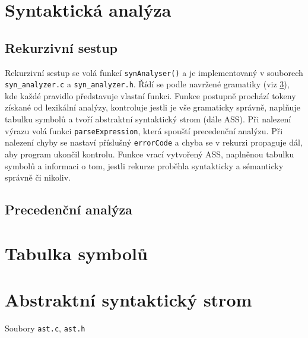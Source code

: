 \documentclass[a4paper, 12pt]{article}
\begin{document}
    \section{Syntaktická analýza}
    
    \subsection{Rekurzivní sestup} \label{sestup}
        Rekurzivní sestup se volá funkcí \texttt{synAnalyser()} a je implementovaný v souborech \texttt{syn\_analyzer.c} a \texttt{syn\_analyzer.h}. Řídí se podle navržené gramatiky (viz \ref{}), kde každé pravidlo představuje vlastní funkci. Funkce postupně prochází tokeny získané od lexikální analýzy, kontroluje jestli je vše gramaticky správně, naplňuje tabulku symbolů a tvoří abstraktní syntaktický strom (dále ASS). Při nalezení výrazu volá funkci \texttt{parseExpression}, která spouští precedenční analýzu. Při nalezení chyby se nastaví příslušný \texttt{errorCode} a chyba se v rekurzi propaguje dál, aby program ukončil kontrolu. Funkce vrací vytvořený ASS, naplněnou tabulku symbolů a informaci o tom, jestli rekurze proběhla syntakticky a sémanticky správně či nikoliv.

    \subsection{Precedenční analýza}

    \section{Tabulka symbolů}

    \section{Abstraktní syntaktický strom}
    Soubory \texttt{ast.c}, \texttt{ast.h}
    
\end{document}
